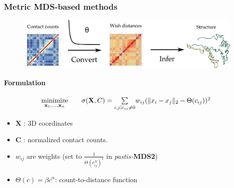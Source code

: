 \documentclass[xcolor=dvipsnames]{beamer}
\begin{document}

\begin{frame}
\frametitle{Metric MDS-based methods}

\begin{figure}
\begin{center}
\includegraphics[width=0.9\linewidth]{figures/mds_idea.png}
\end{center}
\end{figure}
\vspace{1em}

\textbf{\color{Blue} Formulation}
\begin{equation*}
\renewcommand{\arraystretch}{2}
\begin{array}{ccll}
\underset{{\bf x}_1,\ldots,{\bf x}_n}{\text{minimize}} & &
\sigma(\mathbf{X},  C) = \underset{i, j | c_{ij} \neq 0}{\sum} w_{ij}(\|x_i - x_j\|_2 -
\Theta(c_{ij}))^2\,
\\
\end{array}
\end{equation*}
\vspace{2em}

{\tiny
\begin{multicols}{2}
\begin{itemize}[label={$\bullet$}]
\item $\mathbf{X}$ : 3D coordinates
\item $\mathbf{C}$ : normalized contact counts.
\item $w_{ij}$ are weights (set to $\frac{1}{\Theta(c^N_{ij})^2}$ in
\textit{pastis-}\textbf{MDS2}) 
\item $\Theta(c) = \beta c^\alpha$: count-to-distance function
\end{itemize}
\end{multicols}
}
\end{frame}
\end{document}
